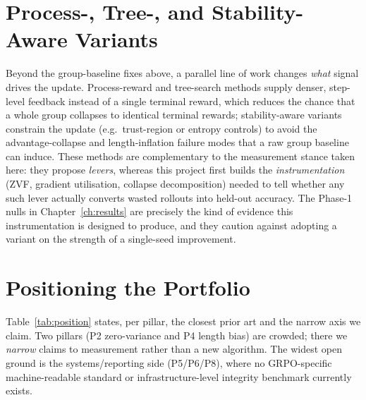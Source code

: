 \section{Process-, Tree-, and Stability-Aware Variants}
Beyond the group-baseline fixes above, a parallel line of work changes \emph{what}
signal drives the update. Process-reward and tree-search methods supply denser,
step-level feedback instead of a single terminal reward, which reduces the chance
that a whole group collapses to identical terminal rewards; stability-aware variants
constrain the update (e.g.\ trust-region or entropy controls) to avoid the
advantage-collapse and length-inflation failure modes that a raw group baseline can
induce. These methods are complementary to the measurement stance taken here: they
propose \emph{levers}, whereas this project first builds the \emph{instrumentation}
(ZVF, gradient utilisation, collapse decomposition) needed to tell whether any such
lever actually converts wasted rollouts into held-out accuracy. The Phase-1 nulls in
Chapter~\ref{ch:results} are precisely the kind of evidence this instrumentation is
designed to produce, and they caution against adopting a variant on the strength of a
single-seed improvement.

\section{Positioning the Portfolio}
Table~\ref{tab:position} states, per pillar, the closest prior art and the narrow
axis we claim. Two pillars (P2 zero-variance and P4 length bias) are crowded; there
we \emph{narrow} claims to measurement rather than a new algorithm. The widest open
ground is the systems/reporting side (P5/P6/P8), where no GRPO-specific
machine-readable standard or infrastructure-level integrity benchmark currently
exists.

